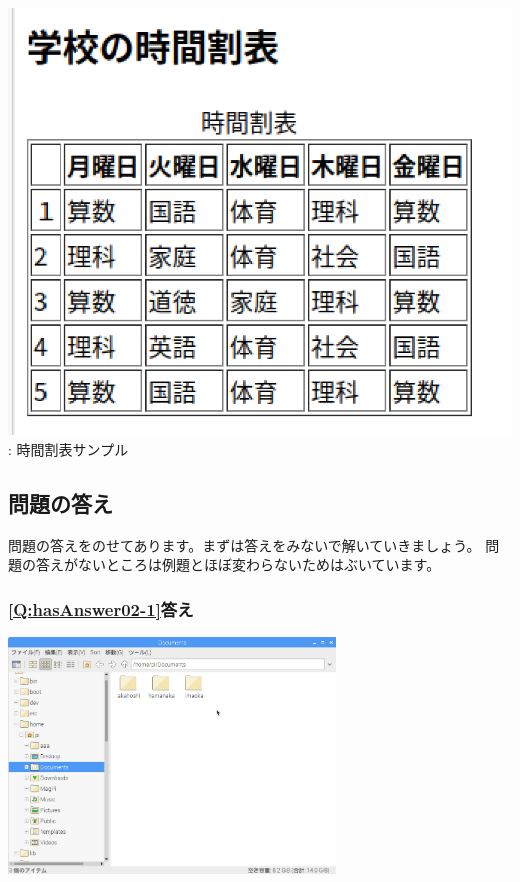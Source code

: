 \documentclass[a4paper,12pt]{jarticle}
\begin{document}
\begin{minipage}{0.4\textwidth}
  {\upshape
    \includegraphics[width=\linewidth]{textbook-img211.png}
    \newline
    {\theFigure\label{seq:refFigure45}}:
    時間割表サンプル}
\end{minipage}

\bigskip

\flushleft
\clearpage\subsection{\bfseries
  問題の答え}

問題の答えをのせてあります。まずは答えをみないで解いていきましょう。\newline
問題の答えがないところは例題とほぼ変わらないためはぶいています。

\subsubsection{\bfseries
  \ref*{Q:hasAnswer02-1}答え}

\bigskip


\centering
\includegraphics[width=0.65\textwidth]{textbook-img212.png}
\flushleft
\end{document}
